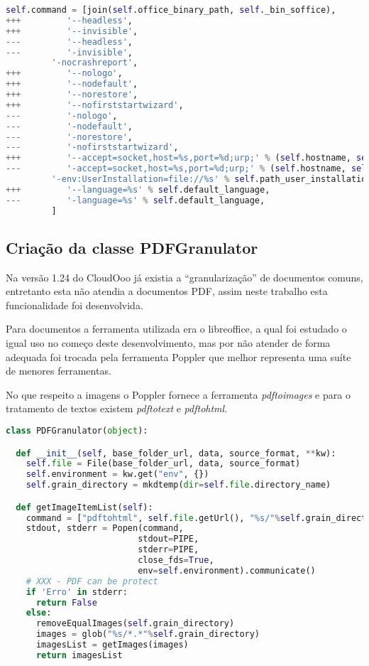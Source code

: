 {\singlespace
\begin{lstlisting}[caption=Exemplo de modificação pra LibreOffice,language=python,label={exemlib}]
    self.command = [join(self.office_binary_path, self._bin_soffice),
+++         '--headless',
+++         '--invisible',
---         '--headless',
---         '-invisible',
         '-nocrashreport',
+++         '--nologo',
+++         '--nodefault',
+++         '--norestore',
+++         '--nofirststartwizard',
---         '-nologo',
---         '-nodefault',
---         '-norestore',
---         '-nofirststartwizard',
+++         '--accept=socket,host=%s,port=%d;urp;' % (self.hostname, self.port),
---         '-accept=socket,host=%s,port=%d;urp;' % (self.hostname, self.port),
         '-env:UserInstallation=file://%s' % self.path_user_installation,
+++         '--language=%s' % self.default_language,
---         '-language=%s' % self.default_language,
         ]
\end{lstlisting}
}

\subsection{Criação da classe PDFGranulator}

Na versão 1.24 do CloudOoo já existia a ``granularização'' de documentos comuns, entretanto esta não atendia a documentos PDF, assim neste trabalho esta funcionalidade foi desenvolvida.

Para documentos a ferramenta utilizada era o libreoffice, a qual foi estudado o igual uso no começo deste desenvolvimento, mas por não atender de forma adequada foi trocada pela ferramenta Poppler que melhor representa uma suíte de menores ferramentas.

No que respeito a imagens o Poppler fornece a ferramenta \textit{pdftoimages} e para o tratamento de textos existem \textit{pdftotext} e \textit{pdftohtml}.

{\singlespace
\begin{lstlisting}[caption=método getImageItemList do PDFGranulator,language=python,label={granim}]
class PDFGranulator(object):

  def __init__(self, base_folder_url, data, source_format, **kw):
    self.file = File(base_folder_url, data, source_format)
    self.environment = kw.get("env", {})
    self.grain_directory = mkdtemp(dir=self.file.directory_name)

  def getImageItemList(self):
    command = ["pdftohtml", self.file.getUrl(), "%s/"%self.grain_directory]
    stdout, stderr = Popen(command,
                          stdout=PIPE,
                          stderr=PIPE,
                          close_fds=True,
                          env=self.environment).communicate()
    # XXX - PDF can be protect
    if 'Erro' in stderr:
      return False
    else:
      removeEqualImages(self.grain_directory)
      images = glob("%s/*.*"%self.grain_directory)
      imagesList = getImages(images)
      return imagesList
\end{lstlisting}
}

